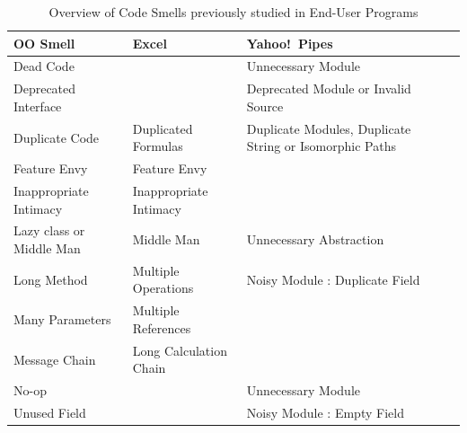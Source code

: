 \documentclass[conference]{IEEEtran}
\renewcommand*\cmidrule{\midrule[0.001em]} %
\begin{document}
\begin{table}
\begin{center}
\caption{Overview of Code Smells previously studied in End-User Programs
\label{table:oosmellslarge}}
\sffamily
\begin{tabular} {@{}llll@{}}
\toprule
\textbf{OO Smell}
	& \textbf{Excel}
	& \textbf{Yahoo!\ Pipes}
\\ \midrule
Dead Code
	& %
	& Unnecessary Module \cite{StoleeTSE2013}
\\ \cmidrule
Deprecated Interface
	& %
	& Deprecated Module or Invalid Source \cite{StoleeTSE2013}

\\ \cmidrule
Duplicate Code
	& Duplicated Formulas \cite{Hermans2012intra}
	& Duplicate Modules, Duplicate String or Isomorphic Paths \cite{StoleeTSE2013}
\\ \cmidrule
Feature Envy
	& Feature Envy \cite{Hermans2012inter}
	& %
\\ \cmidrule
Inappropriate Intimacy
	& Inappropriate Intimacy \cite{Hermans2012inter}
	& %
\\ \cmidrule
Lazy class or Middle Man
	& Middle Man \cite{Hermans2012inter}
	& Unnecessary Abstraction \cite{StoleeTSE2013}
\\ \cmidrule
Long Method
	& Multiple Operations \cite{Hermans2012intra}
	& Noisy Module : Duplicate Field \cite{StoleeTSE2013}
\\ \cmidrule
Many Parameters
	& Multiple References \cite{Hermans2012intra}
	& 
\\ \cmidrule
Message Chain
	& Long Calculation Chain \cite{Hermans2012intra}
	& 
\\ \cmidrule
No-op
	& %
	& Unnecessary Module \cite{StoleeTSE2013}
\\ \cmidrule
Unused Field
	& %
	& Noisy Module : Empty Field \cite{StoleeTSE2013}
\\ \bottomrule
\end{tabular}
\end{center}
\vspace{-12pt}
\end{table}
\end{document}
